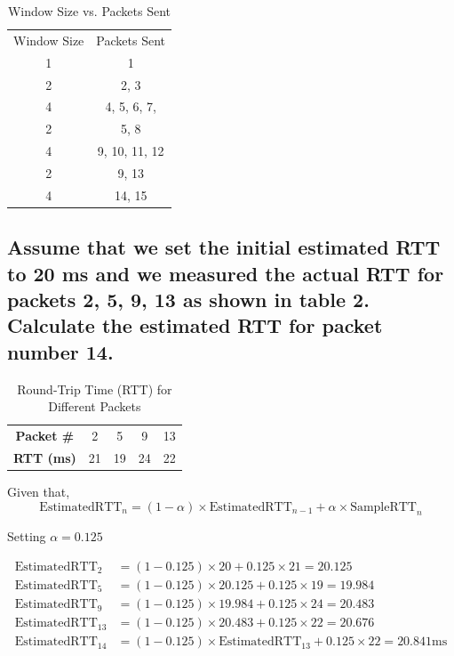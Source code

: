 \documentclass{article}
\begin{document}
	\begin{table}[h]
		\centering
		\begin{tabular}{cc}
			Window Size & Packets Sent \\
			1 & 1 \\
			2 & 2, 3 \\
			4 & 4, 5, 6, 7, \\
			2 & 5, 8 \\
			4 & 9, 10, 11, 12 \\
			2 & 9, 13 \\
			4 & 14, 15 \\
		\end{tabular}
		\caption{Window Size vs. Packets Sent}
		\label{tab:window_packets}
	\end{table}

\subsection{Assume that we set the initial estimated RTT to 20 ms and we measured the
actual RTT for packets 2, 5, 9, 13 as shown in table 2. Calculate the estimated RTT for
packet number 14.}

	\begin{table}[h]
		\centering
		\begin{tabular}{ccccc}
			\textbf{Packet \#} & 2  & 5  & 9  & 13 \\
			\textbf{RTT (ms)}  & 21 & 19 & 24 & 22 \\
		\end{tabular}
		\caption{Round-Trip Time (RTT) for Different Packets}
		\label{tab:rtt_data}
	\end{table}

	Given that,
	\[
		\text{EstimatedRTT}_n = (1 - \alpha) \times \text{EstimatedRTT}_{n-1} + \alpha \times \text{SampleRTT}_n
	\]

	Setting $\alpha=0.125$

	\[
		\begin{aligned}
			\text{EstimatedRTT}_2 &= (1 - 0.125) \times 20 + 0.125 \times 21 = 20.125 \\
			\text{EstimatedRTT}_5 &= (1 - 0.125) \times 20.125 + 0.125 \times 19 = 19.984 \\
			\text{EstimatedRTT}_9 &= (1 - 0.125) \times 19.984 + 0.125 \times 24 = 20.483 \\
			\text{EstimatedRTT}_{13} &= (1 - 0.125) \times 20.483 + 0.125 \times 22 = 20.676 \\
			\hline
			\text{EstimatedRTT}_{14} &= (1 - 0.125) \times \text{EstimatedRTT}_{13}  + 0.125 \times 22 = 20.841 \text{ms}
		\end{aligned}
	\]
\end{document}

